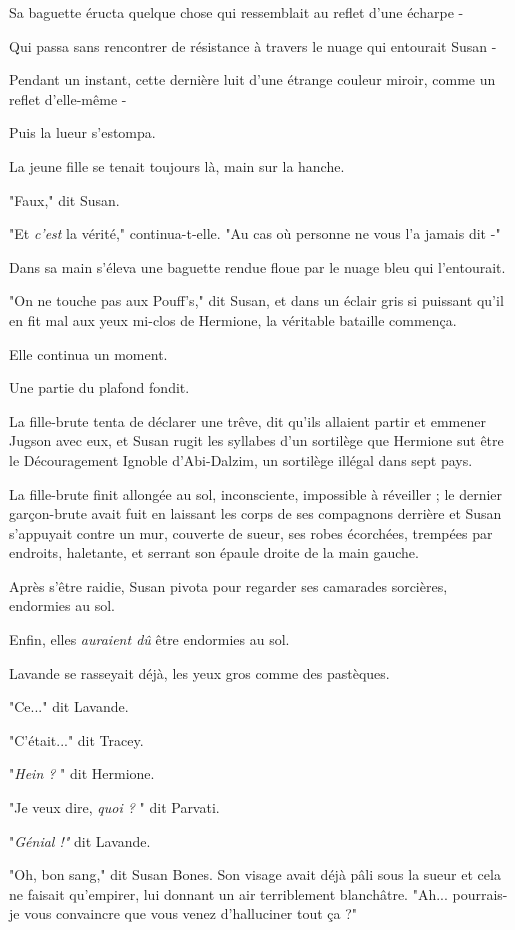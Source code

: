 Sa baguette éructa quelque chose qui ressemblait au reflet d'une écharpe -

Qui passa sans rencontrer de résistance à travers le nuage qui entourait Susan -

Pendant un instant, cette dernière luit d'une étrange couleur miroir, comme un reflet d'elle-même -

Puis la lueur s'estompa.

La jeune fille se tenait toujours là, main sur la hanche.

"Faux," dit Susan.

"Et \emph{c'est}  la vérité," continua-t-elle. "Au cas où personne ne vous l'a jamais dit -"

Dans sa main s'éleva une baguette rendue floue par le nuage bleu qui l'entourait.

"On ne touche pas aux Pouff's," dit Susan, et dans un éclair gris si puissant qu'il en fit mal aux yeux mi-clos de Hermione, la véritable bataille commença.

Elle continua un moment.

Une partie du plafond fondit.

La fille-brute tenta de déclarer une trêve, dit qu'ils allaient partir et emmener Jugson avec eux, et Susan rugit les syllabes d'un sortilège que Hermione sut être le Découragement Ignoble d'Abi-Dalzim, un sortilège illégal dans sept pays.

La fille-brute finit allongée au sol, inconsciente, impossible à réveiller ; le dernier garçon-brute avait fuit en laissant les corps de ses compagnons derrière et Susan s'appuyait contre un mur, couverte de sueur, ses robes écorchées, trempées par endroits, haletante, et serrant son épaule droite de la main gauche.

Après s'être raidie, Susan pivota pour regarder ses camarades sorcières, endormies au sol.

Enfin, elles \emph{auraient dû}  être endormies au sol.

Lavande se rasseyait déjà, les yeux gros comme des pastèques.

"Ce..." dit Lavande.

"C'était..." dit Tracey.

"\emph{Hein ?} " dit Hermione.

"Je veux dire, \emph{quoi ?} " dit Parvati.

"\emph{Génial !"}  dit Lavande.

"Oh, bon sang," dit Susan Bones. Son visage avait déjà pâli sous la sueur et cela ne faisait qu'empirer, lui donnant un air terriblement blanchâtre. "Ah... pourrais-je vous convaincre que vous venez d'halluciner tout ça ?"

